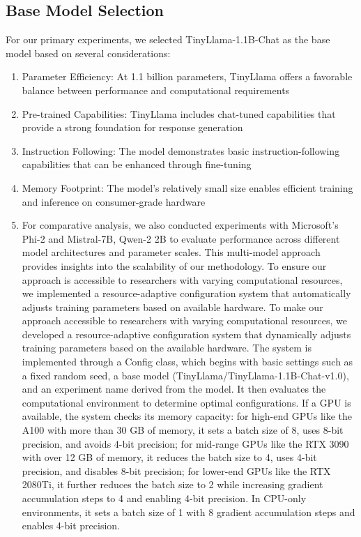 \documentclass[11pt]{article}
\begin{document}
\subsection{Base Model Selection}
For our primary experiments, we selected TinyLlama-1.1B-Chat as the base model based on several considerations:
\begin{enumerate}
    \item Parameter Efficiency: At 1.1 billion parameters, TinyLlama offers a favorable balance between performance and computational requirements
    \item Pre-trained Capabilities: TinyLlama includes chat-tuned capabilities that provide a strong foundation for response generation
    \item Instruction Following: The model demonstrates basic instruction-following capabilities that can be enhanced through fine-tuning
    \item Memory Footprint: The model's relatively small size enables efficient training and inference on consumer-grade hardware
    \item For comparative analysis, we also conducted experiments with Microsoft's Phi-2 and Mistral-7B, Qwen-2 2B to evaluate performance across different model architectures and parameter scales. This multi-model approach provides insights into the scalability of our methodology. To ensure our approach is accessible to researchers with varying computational resources, we implemented a resource-adaptive configuration system that automatically adjusts training parameters based on available hardware. To make our approach accessible to researchers with varying computational resources, we developed a resource-adaptive configuration system that dynamically adjusts training parameters based on the available hardware. The system is implemented through a Config class, which begins with basic settings such as a fixed random seed, a base model (TinyLlama/TinyLlama-1.1B-Chat-v1.0), and an experiment name derived from the model. It then evaluates the computational environment to determine optimal configurations. If a GPU is available, the system checks its memory capacity: for high-end GPUs like the A100 with more than 30 GB of memory, it sets a batch size of 8, uses 8-bit precision, and avoids 4-bit precision; for mid-range GPUs like the RTX 3090 with over 12 GB of memory, it reduces the batch size to 4, uses 4-bit precision, and disables 8-bit precision; for lower-end GPUs like the RTX 2080Ti, it further reduces the batch size to 2 while increasing gradient accumulation steps to 4 and enabling 4-bit precision. In CPU-only environments, it sets a batch size of 1 with 8 gradient accumulation steps and enables 4-bit precision.
\end{enumerate}
\end{document}
